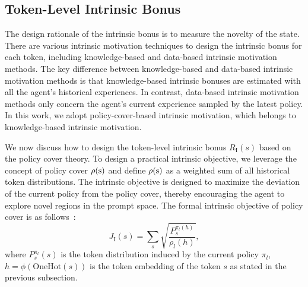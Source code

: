 \documentclass[letterpaper]{article} %
\def\rs{{\textnormal{s}}}
\begin{document}
\subsection{Token-Level Intrinsic Bonus}

The design rationale of the intrinsic bonus is to measure the novelty of the state. There are various intrinsic motivation techniques to design the intrinsic bonus for each token, including knowledge-based and data-based intrinsic motivation methods\cite{zheng2024constrained}. The key difference between knowledge-based and data-based intrinsic motivation methods is that knowledge-based intrinsic bonuses are estimated with all the agent's historical experiences. In contrast, data-based intrinsic motivation methods only concern the agent's current experience sampled by the latest policy. In this work, we adopt policy-cover-based intrinsic motivation, which belongs to knowledge-based intrinsic motivation.

We now discuss how to design the token-level intrinsic bonus $R_\text{I}(s)$ based on the policy cover theory. To design a practical intrinsic objective, we leverage the concept of policy cover $\rho(\rs)$ and define $\rho(\rs)$ as a weighted sum of all historical token distributions. The intrinsic objective is designed to maximize the deviation of the current policy from the policy cover, thereby encouraging the agent to explore novel regions in the prompt space. The formal intrinsic objective of policy cover is as follows~\cite{agarwal2020pc}:
\begin{equation}
\label{eqn: xz-intrinsic objective}
J_\text{I}(s) = \sum_s \sqrt{ \frac{P_s^{\pi_l(h)}}{\rho_l(h)} },
\end{equation}
where $P_s^{\pi_l}(s)$ is the token distribution induced by the current policy $\pi_l$, $h=\phi(\text{OneHot}(s))$ is the token embedding of the token $s$ as stated in the previous subsection.
\end{document}
